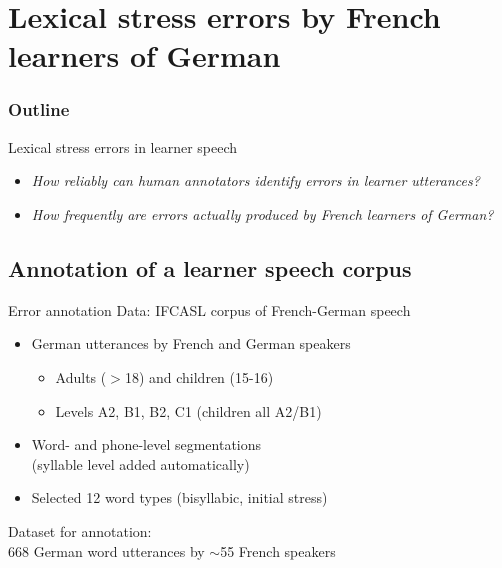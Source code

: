 \documentclass[xcolor={dvipsnames}]{beamer}
\newcommand{\TODO}[1]{{\color{red}\textbf{[TODO #1]}}}
\begin{document}
\section{Lexical stress errors by French learners of German}

{ 
\begin{frame}[noframenumbering,label=outline]
\frametitle{Outline}
\tableofcontents[currentsection]
\end{frame}
}

		\begin{frame}{Lexical stress errors in learner speech}
		\begin{itemize}
		\item{\textit{How reliably can human annotators identify errors in learner utterances?}}
		\vspace{1em}
		\item{\textit{How frequently are  errors actually produced by French learners of German?}}
		\end{itemize}
		

		\end{frame}
		
	\subsection{Annotation of a learner speech corpus}
		\begin{frame}{Error annotation}
		Data: IFCASL corpus of French-German speech
		\begin{itemize}
			\item{German utterances by French and German speakers
				\begin{itemize}
				\item Adults ($>$18) and children (15-16)
				\item Levels A2, B1, B2, C1 (children all A2/B1)
				\end{itemize}
			}
			\item{Word- and phone-level segmentations\\(syllable level added automatically)}
			\item{Selected 12 word types (bisyllabic, initial stress)}

		\end{itemize}
		
		\vfill
		Dataset for annotation:\\
		\hspace*{20pt} 668 German word utterances by $\sim$55 French speakers
		\end{frame}
		
\end{document}
